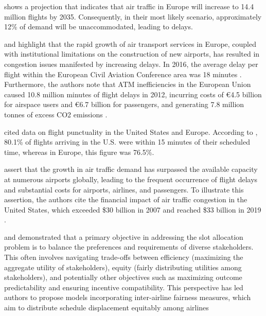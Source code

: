 shows a projection that indicates that air traffic in Europe will increase to 14.4 million flights by 2035. Consequently, in their most likely scenario, approximately 12\% of demand will be unaccommodated, leading to delays.

  and  highlight that the rapid growth of air transport services in Europe, coupled with institutional limitations on the construction of new airports, has resulted in congestion issues manifested by increasing delays. In 2016, the average delay per flight within the European Civil Aviation Conference area was 18 minutes \cite{Eurocontrol_AnnualReport2016}. Furthermore, the authors note that \acrfull{ATM} inefficiencies in the European Union caused 10.8 million minutes of flight delays in 2012, incurring costs of €4.5 billion for airspace users and €6.7 billion for passengers, and generating 7.8 million tonnes of excess CO2 emissions \cite{IATA_SESFactsheet2014a}.

 cited data on flight punctuality in the United States and Europe. According to , 80.1\% of flights arriving in the U.S. were within 15 minutes of their scheduled time, whereas in Europe, this figure was 76.5\%.

 assert that the growth in air traffic demand has surpassed the available capacity at numerous airports globally, leading to the frequent occurrence of flight delays and substantial costs for airports, airlines, and passengers. To illustrate this assertion, the authors cite the financial impact of air traffic congestion in the United States, which exceeded \$30 billion in 2007 \cite{gillen2016airport, jacquillat_interairline_2018, jacquillat_roadmap_2018, ribeiro_large-scale_2019} and reached \$33 billion in 2019 \cite{dixit_algorithmic_2023}.

 and \cite{zografos_bi-objective_2019} demonstrated that a primary objective in addressing the slot allocation problem is to balance the preferences and requirements of diverse stakeholders. This often involves navigating trade-offs between efficiency (maximizing the aggregate utility of stakeholders), equity (fairly distributing utilities among stakeholders), and potentially other objectives such as maximizing outcome predictability and ensuring incentive compatibility. This perspective has led authors to propose models incorporating inter-airline fairness measures, which aim to distribute schedule displacement equitably among airlines \cite{fairbrother2018development, jacquillat_roadmap_2018,  zografos_bi-objective_2019, jiang_decision_2021}

